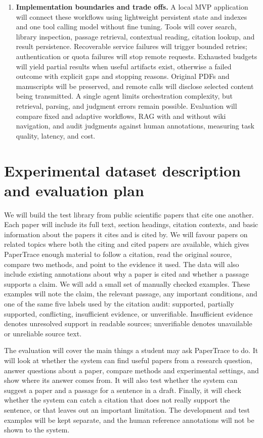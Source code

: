 \documentclass{article}
\begin{document}
\begin{enumerate}
\item \textbf{Implementation boundaries and trade offs.} A local MVP application will connect these workflows using lightweight persistent state and indexes and one tool calling model without fine tuning. Tools will cover search, library inspection, passage retrieval, contextual reading, citation lookup, and result persistence. Recoverable service failures will trigger bounded retries; authentication or quota failures will stop remote requests. Exhausted budgets will yield partial results when useful artifacts exist, otherwise a failed outcome with explicit gaps and stopping reasons. Original PDFs and manuscripts will be preserved, and remote calls will disclose selected content being transmitted. A single agent limits orchestration complexity, but retrieval, parsing, and judgment errors remain possible. Evaluation will compare fixed and adaptive workflows, RAG with and without wiki navigation, and audit judgments against human annotations, measuring task quality, latency, and cost.
\end{enumerate}

\section{Experimental dataset description and evaluation plan}
We will build the test library from public scientific papers that cite one another. Each paper will
include its full text, section headings, citation contexts, and basic information about the papers
it cites and is cited by. We will favour papers on related topics where both the citing and cited
papers are available, which gives PaperTrace enough material to follow a citation, read the original
source, compare two methods, and point to the evidence it used. The data will also include existing
annotations about why a paper is cited and whether a passage supports a claim. We will add a small
set of manually checked examples. These examples will note the claim, the relevant passage, any
important conditions, and one of the same five labels used by the citation audit: supported,
partially supported, conflicting, insufficient evidence, or unverifiable. Insufficient evidence
denotes unresolved support in readable sources; unverifiable denotes unavailable or unreliable
source text.

The evaluation will cover the main things a student may ask PaperTrace to do. It will look at
whether the system can find useful papers from a research question, answer questions about a paper,
compare methods and experimental settings, and show where its answer comes from. It will also test
whether the system can suggest a paper and a passage for a sentence in a draft. Finally, it will
check whether the system can catch a citation that does not really support the sentence, or that
leaves out an important limitation. The development and test examples will be kept separate, and
the human reference annotations will not be shown to the system.
\end{document}
